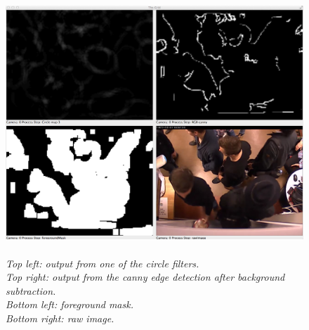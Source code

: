 \newpage
\begin{figure}[htb]
	\centering
	\includegraphics[width=\linewidth]{images/circle_detection_fail.png}
	\caption[An example of a failed Hough-circle detection]{\textit{\\
	Top left: output from one of the circle filters.\\
	Top right: output from the canny edge detection after background subtraction.\\
	Bottom left: foreground mask. \\
	Bottom right: raw image.}}
	\label{fig:circle_fail}  %
\end{figure}

